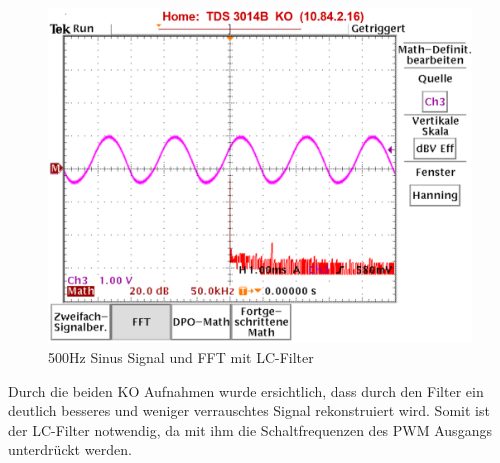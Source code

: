 \begin{figure}
\center
\includegraphics[scale=1.0]{data/500Hz_Sin_mit_Filter_FFT.png}
\caption{500Hz Sinus Signal und FFT mit LC-Filter}
\label{fig 500Hz mit Filter}
\end{figure}

Durch die beiden KO Aufnahmen wurde ersichtlich, dass durch den Filter ein deutlich besseres und weniger verrauschtes Signal rekonstruiert wird. Somit ist der LC-Filter notwendig, da mit ihm die Schaltfrequenzen des PWM Ausgangs unterdrückt werden. 